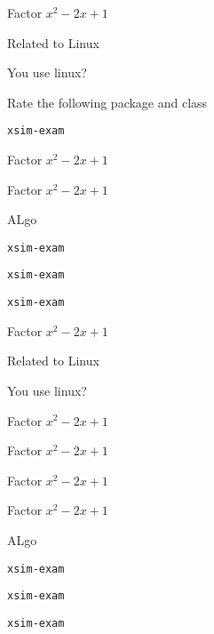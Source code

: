 \documentclass{article}
\begin{document}
\begin{enumext}[save-ans=simplews-2,columns=2,check-ans=true,show-pos,nosep,save-ref]
  \item Factor $x^{2}-2x+1$ 
  \item Related to Linux
    \begin{enumext}[nosep,columns*=2]
      \item You use linux? 
      \item Rate the following package and class
        \begin{enumext}
          \item \texttt{xsim-exam} 
        \end{enumext}
    \end{enumext}
       \item Factor $x^{2}-2x+1$ 
   \item Factor $x^{2}-2x+1$ 
     \item ALgo
         \begin{enumext*}[nosep]
          \item* \texttt{xsim-exam} 
           \item* \texttt{xsim-exam} 
            \item* \texttt{xsim-exam} 
        \end{enumext*}
\end{enumext}

\begin{enumext}[save-ans=simplews,columns=1,check-ans=true,show-pos,nosep,save-ref]
  \item Factor $x^{2}-2x+1$ 
  \item Related to Linux
    \begin{enumext}[nosep,columns*=2]
      \item You use linux? 
      \item Factor $x^{2}-2x+1$ 
      \item Factor $x^{2}-2x+1$ 
    \end{enumext}
   \item Factor $x^{2}-2x+1$ 
   \item Factor $x^{2}-2x+1$ 
   \item ALgo
         \begin{enumext}[nosep]
          \item* \texttt{xsim-exam} 
           \item* \texttt{xsim-exam} 
            \item* \texttt{xsim-exam} 
        \end{enumext}
\end{enumext}
\end{document}
